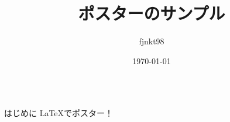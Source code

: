 \documentclass[dvipdfmx, final]{beamer}
\title{ポスターのサンプル}
\author{fjnkt98}
\institute{NITIC}
\date{\today}
\begin{document}
  \begin{columns}
    \begin{column}{.32\linewidth}
      \begin{block}{はじめに}
        \LaTeX でポスター！
      \end{block}
    \end{column}
  \end{columns}
\end{document}
